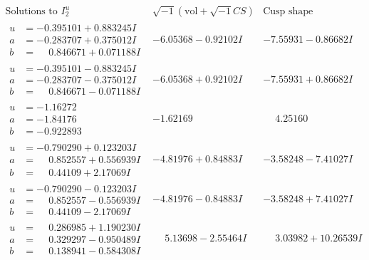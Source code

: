 \documentclass[1p]{elsarticle_modified}
\theoremstyle{definition}
\newcommand{\I}{\sqrt{-1}}
\begin{document}
$$\begin{array}{c|c|c}  
\text{Solutions to }I^u_{2}& \I (\text{vol} + \sqrt{-1}CS) & \text{Cusp shape}\\
 \hline 
\begin{aligned}
u &= -0.395101 + 0.883245 I \\
a &= -0.283707 + 0.375012 I \\
b &= \phantom{-}0.846671 + 0.071188 I\end{aligned}
 & -6.05368 - 0.92102 I & -7.55931 - 0.86682 I \\ \hline\begin{aligned}
u &= -0.395101 - 0.883245 I \\
a &= -0.283707 - 0.375012 I \\
b &= \phantom{-}0.846671 - 0.071188 I\end{aligned}
 & -6.05368 + 0.92102 I & -7.55931 + 0.86682 I \\ \hline\begin{aligned}
u &= -1.16272\phantom{ +0.000000I} \\
a &= -1.84176\phantom{ +0.000000I} \\
b &= -0.922893\phantom{ +0.000000I}\end{aligned}
 & -1.62169\phantom{ +0.000000I} & \phantom{-}4.25160\phantom{ +0.000000I} \\ \hline\begin{aligned}
u &= -0.790290 + 0.123203 I \\
a &= \phantom{-}0.852557 + 0.556939 I \\
b &= \phantom{-}0.44109 + 2.17069 I\end{aligned}
 & -4.81976 + 0.84883 I & -3.58248 - 7.41027 I \\ \hline\begin{aligned}
u &= -0.790290 - 0.123203 I \\
a &= \phantom{-}0.852557 - 0.556939 I \\
b &= \phantom{-}0.44109 - 2.17069 I\end{aligned}
 & -4.81976 - 0.84883 I & -3.58248 + 7.41027 I \\ \hline\begin{aligned}
u &= \phantom{-}0.286985 + 1.190230 I \\
a &= \phantom{-}0.329297 - 0.950489 I \\
b &= \phantom{-}0.138941 - 0.584308 I\end{aligned}
 & \phantom{-}5.13698 - 2.55464 I & \phantom{-}3.03982 + 10.26539 I \\ \hline\begin{aligned}

\end{aligned}
\end{array}$$
\end{document}
